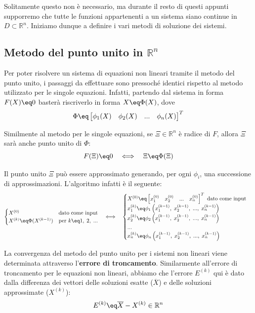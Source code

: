 Solitamente questo non è necessario, ma durante il resto di questi appunti supporremo che tutte le funzioni appartenenti a un sistema siano continue in $D \subset \mathbb{R}^n$. Iniziamo dunque a definire i vari metodi di soluzione dei sistemi.

\subsection{Metodo del punto unito in \texorpdfstring{$\mathbb{R}^n$}{R^n}}

Per poter risolvere un sistema di equazioni non lineari tramite il metodo del punto unito, i passaggi da effettuare sono pressoché identici rispetto al metodo utilizzato per le singole equazioni. Infatti, partendo dal sistema in forma $F(X) \eq 0$ basterà riscriverlo in forma $X \eq \Phi(X)$, dove
\[ \Phi \eq \begin{bmatrix} \phi_1(X) & \phi_2(X) & ... & \phi_n(X) \end{bmatrix}^T \]

Similmente al metodo per le singole equazioni, se $\Xi \in \mathbb{R}^n$ è radice di $F$, allora $\Xi$ sarà anche punto unito di $\Phi$:
\[ F(\Xi) \eq 0 \quad \Longleftrightarrow \quad \Xi \eq \Phi(\Xi) \]

Il punto unito $\Xi$ può essere approssimato generando, per ogni $\phi_i$, una successione di approssimazioni. L'algoritmo infatti è il seguente:
\[ \begin{cases}
    X^{(0)} & \text{dato come input} \\
    X^{(k)} \eq \Phi(X^{(k - 1)}) & \text{per } k \eq 1, \; 2, \; ...
\end{cases} \quad \Longleftrightarrow \quad \begin{cases}
    X^{(0)} \eq \begin{bmatrix} x_1^{(0)} & x_2^{(0)} & ... & x_n^{(0)} \end{bmatrix}^T \text{ dato come input} \\
    x_1^{(k)} \eq \phi_1\left( x_1^{(k - 1)}, \; x_2^{(k - 1)}, \; ..., \; x_n^{(k - 1)} \right) \\
    x_2^{(k)} \eq \phi_2\left( x_1^{(k - 1)}, \; x_2^{(k - 1)}, \; ..., \; x_n^{(k - 1)} \right) \\
    ... \\
    x_n^{(k)} \eq \phi_n\left( x_1^{(k - 1)}, \; x_2^{(k - 1)}, \; ..., \; x_n^{(k - 1)} \right)
\end{cases} \]

La convergenza del metodo del punto unito per i sistemi non lineari viene determinata attraverso l'\textbf{errore di troncamento}. Similarmente all'errore di troncamento per le equazioni non lineari, abbiamo che l'errore $E^{(k)}$ qui è dato dalla differenza dei vettori delle soluzioni esatte ($\overline{X}$) e delle soluzioni approssimate ($X^{(k)}$):
\[ E^{(k)} \eq \overline{X} - X^{(k)} \in \mathbb{R}^n \]

